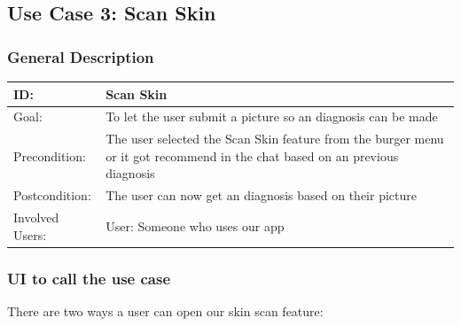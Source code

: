 \subsection{Use Case 3: Scan Skin}

    \subsubsection{General Description}
    
        \begin{tabular}{|p{.2\linewidth}|p{.65\linewidth}|}
        \hline 
        ID: & Scan Skin \\ \hline
        Goal: & To let the user submit a picture so an diagnosis can be made \\ \hline
        Precondition: & The user selected the Scan Skin feature from the burger menu or it got recommend in the chat based on an previous diagnosis  \\ \hline
        Postcondition: & The user can now get an diagnosis based on their picture \\ \hline
        Involved Users: & User:  Someone who uses our app \\ \hline
        \end{tabular}
    
    \subsubsection{UI to call the use case}
        
        There are two ways a user can open our skin scan feature:
        
